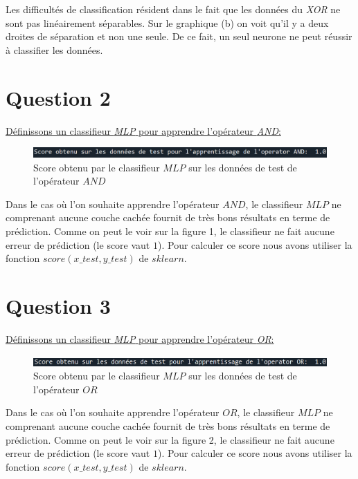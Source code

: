 \documentclass[frenchb]{report}
\newcommand{\1}{\mathbbm{1}}
\theoremstyle{definition}\newtheorem{defn}{Définition}
\theoremstyle{definition}\newtheorem{exm}{Exemple}
\theoremstyle{definition}\newtheorem{nota}{Notation}
\theoremstyle{definition}\newtheorem{rem}{Remarque}
\begin{document}
Les difficultés de classification résident dans le fait que les données du \textit{XOR} ne sont pas linéairement séparables. Sur le graphique (b) on voit qu'il y a deux droites de séparation et non une seule. De ce fait, un seul neurone ne peut réussir à classifier les données.

\section*{Question 2}


\underline{Définissons un classifieur \textit{MLP} pour apprendre l’opérateur \textit{AND}:}

\begin{figure}[H]
	\centering
	\includegraphics[scale=0.7]{images/Q2.png}
	\caption{Score obtenu par le classifieur $MLP$ sur les données de test de l'opérateur $AND$}
\end{figure}
Dans le cas où l'on souhaite apprendre l'opérateur $AND$, le classifieur $MLP$ ne comprenant aucune couche cachée fournit de très bons résultats en terme de prédiction. Comme on peut le voir sur la figure 1, le classifieur ne fait aucune erreur de prédiction (le score vaut $1$). Pour calculer ce score nous avons utiliser la fonction $score(x\_test, y\_test)$ de $sklearn$.
\section*{Question 3}


\underline{Définissons un classifieur \textit{MLP} pour apprendre l’opérateur \textit{OR}:}

\begin{figure}[H]
	\centering
	\includegraphics[scale=0.7]{images/Q3.png}
	\caption{Score obtenu par le classifieur $MLP$ sur les données de test de l'opérateur $OR$}
\end{figure}
Dans le cas où l'on souhaite apprendre l'opérateur $OR$, le classifieur $MLP$ ne comprenant aucune couche cachée fournit de très bons résultats en terme de prédiction. Comme on peut le voir sur la figure 2, le classifieur ne fait aucune erreur de prédiction (le score vaut $1$). Pour calculer ce score nous avons utiliser la fonction $score(x\_test, y\_test)$ de $sklearn$.
\end{document}
